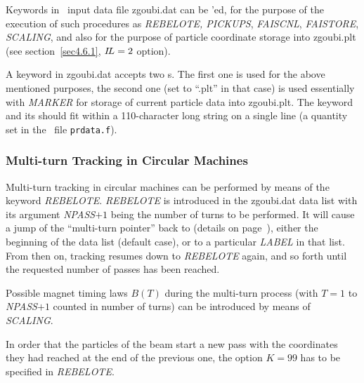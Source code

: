 Keywords in \zgou\ input data file zgoubi.dat can be \LABEL'ed, for the purpose of 
the execution of such procedures as  \textsl{REBELOTE,  PICKUPS}, 
\textsl{FAISCNL}, \textsl{FAISTORE}, 
 \textsl{SCALING}, and also for the purpose of 
particle coordinate storage into zgoubi.plt (see section~\ref{sec4.6.1}, 
$I\!L=2$ option). 

\medskip 

\noindent A keyword in zgoubi.dat accepts two \LABEL s. The first one is used for the 
above mentioned purposes, the second one (set to ``.plt'' in that case) is used essentially 
 with \textsl{MARKER} for storage of current particle data 
into zgoubi.plt. The keyword and its \LABEL[s] should fit within a 110-character 
long string on a single line (a quantity set in the \FORTRAN\ file \texttt{prdata.f}). 

\subsubsection{Multi-turn Tracking in Circular Machines \label{sec4.6.5} } 

Multi-turn tracking  in circular machines can be performed by
means of the keyword \textsl{REBELOTE}. \textsl{REBELOTE} is introduced in 
the  zgoubi.dat data list with its argument \textsl{NPASS}$+1$ being the number of turns to be 
performed. 
It will cause a jump of  the ``multi-turn pointer''  back to (details on page~\pageref{REBELOTE}), 
either the beginning of the data list (default case), or to a particular \textsl{LABEL} 
in that list. From then on, tracking resumes down to \textsl{REBELOTE} again, and so forth until the 
requested number of passes has been reached. 

\medskip

\noindent Possible magnet  timing laws $ B(T)$  during the multi-turn process 
(with $T=1 $ to \textsl{NPASS}$+1$  counted in number of turns) can be introduced by means of \textsl{SCALING}. 

\medskip 

\noindent In order that the \IMAX{} particles of the beam start a new 
pass with the coordinates they had reached at the end of the 
previous one, the option $ K=99 $ has to be specified in \textsl{REBELOTE}.

\medskip



